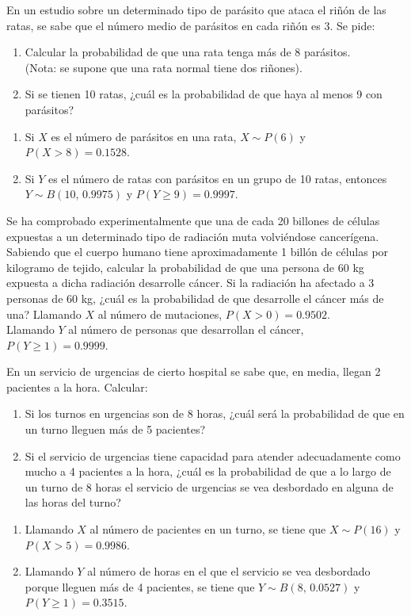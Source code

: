{En un estudio sobre un determinado tipo de parásito que ataca el riñón de las ratas, se sabe que el número medio de
parásitos en cada riñón es 3.
Se pide:
\begin{enumerate}
\item  Calcular la probabilidad de que una rata tenga más de 8 parásitos.\\
(Nota: se supone que una rata normal tiene dos riñones).
\item  Si se tienen 10 ratas, ¿cuál es la probabilidad de que haya al menos 9 con parásitos?
\end{enumerate}
}
{
\begin{enumerate}
\item Si $X$ es el número de parásitos en una rata, $X\sim P(6)$ y $P(X>8)=0.1528$.
\item Si $Y$ es el número de ratas con parásitos en un grupo de 10 ratas, entonces $Y\sim B(10,\,0.9975)$ y $P(Y\geq
9)=0.9997$.
\end{enumerate}
}
{}


{Se ha comprobado experimentalmente que una de cada 20 billones de células expuestas a un determinado tipo de radiación muta volviéndose
cancerígena. Sabiendo que el cuerpo humano tiene aproximadamente 1 billón de células por kilogramo de tejido, calcular la probabilidad de
que una persona de 60 kg expuesta a dicha radiación desarrolle cáncer. Si la radiación ha afectado a 3 personas de 60 kg, ¿cuál es la
probabilidad de que desarrolle el cáncer más de una? }
{Llamando $X$ al número de mutaciones, $P(X>0)=0.9502$.\\ 
Llamando $Y$ al número de personas que desarrollan el cáncer, $P(Y\geq 1)=0.9999$.
}
{}


{En un servicio de urgencias de cierto hospital se sabe que, en media, llegan 2 pacientes a la hora.
Calcular:
\begin{enumerate}
\item Si los turnos en urgencias son de 8 horas, ¿cuál será la probabilidad de que en un turno lleguen más de 5 pacientes?
\item Si el servicio de urgencias tiene capacidad para atender adecuadamente como mucho a 4 pacientes a la hora, ¿cuál
es la probabilidad de que a lo largo de un turno de 8 horas el servicio de urgencias se vea desbordado en alguna de las
horas del turno?
\end{enumerate}
}
{
\begin{enumerate}
\item Llamando $X$ al número de pacientes en un turno, se tiene que $X\sim P(16)$ y $P(X>5)=0.9986$.
\item Llamando $Y$ al número de horas en el que el servicio se vea desbordado porque lleguen más de 4 pacientes, se
tiene que $Y\sim B(8,\,0.0527)$ y $P(Y\geq 1)=0.3515$.
\end{enumerate}
}
{}


